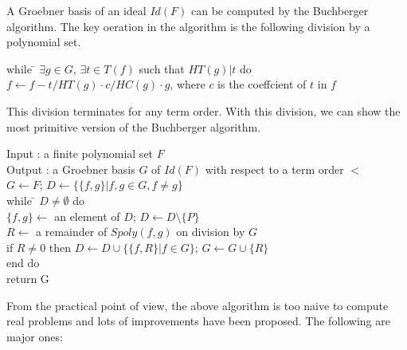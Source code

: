 \documentclass[runningheads]{cl2emult}
\begin{document}
A Groebner basis of an ideal $Id(F)$ can be computed by the Buchberger
algorithm. The key oeration in the algorithm is the following 
division by a polynomial set.
\begin{tabbing}
while \= $\exists g \in G$, $\exists t \in T(f)$ such that $HT(g)|t$ do\\
      \> $f \leftarrow f - t/HT(g) \cdot c/HC(g) \cdot g$, \quad
      where $c$ is the coeffcient of $t$ in $f$
\end{tabbing}
This division terminates for any term order.
With this division, we can show the most primitive version of the
Buchberger algorithm.
\begin{tabbing}
Input : a finite polynomial set $F$\\
Output : a Groebner basis $G$ of $Id(F)$ with respect to a term order $<$\\
$G \leftarrow F$; \quad $D \leftarrow \{\{f,g\}| f, g \in G, f \neq g \}$\\
while \= $D \neq \emptyset$ do \\
      \> $\{f,g\} \leftarrow$ an element of $D$; \quad
          $D \leftarrow D \setminus \{P\}$\\
      \> $R \leftarrow$ a remainder of $Spoly(f,g)$ on division by $G$\\
      \> if $R \neq 0$ then $D \leftarrow D \cup \{\{f,R\}| f \in G\}$; \quad
         $G \leftarrow G \cup \{R\}$\\
end do\\
return G
\end{tabbing}
From the practical point of view, the above algorithm is too naive to
compute real problems and lots of improvements have been proposed.
The following are major ones:
\end{document}
